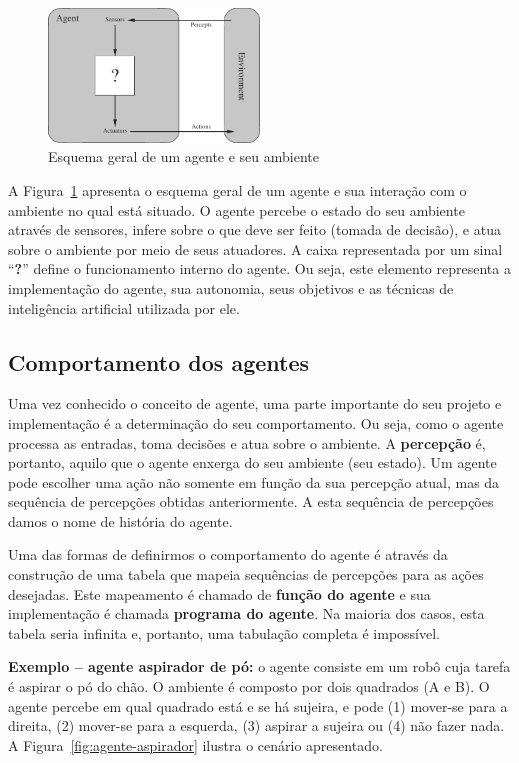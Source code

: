 \insertspace

\begin{figure}[h]
	\centering
	\includegraphics[width=0.5\textwidth]{img/agente-ambiente}
	\caption{Esquema geral de um agente e seu ambiente}
	\label{fig:agente-ambiente}
\end{figure}

A Figura~\ref{fig:agente-ambiente} apresenta o esquema geral de um agente e sua interação com o ambiente no qual está situado. O agente percebe o estado do seu ambiente através de sensores, infere sobre o que deve ser feito (tomada de decisão), e atua sobre o ambiente por meio de seus atuadores. A caixa representada por um sinal ``\textbf{?}'' define o funcionamento interno do agente. Ou seja, este elemento representa a implementação do agente, sua autonomia, seus objetivos e as técnicas de inteligência artificial utilizada por ele.

\subsection{Comportamento dos agentes}

Uma vez conhecido o conceito de agente, uma parte importante do seu projeto e implementação é a determinação do seu comportamento. Ou seja, como o agente processa as entradas, toma decisões e atua sobre o ambiente. A \textbf{percepção} é, portanto, aquilo que o agente enxerga do seu ambiente (seu estado). Um agente pode escolher uma ação não somente em função da sua percepção atual, mas da sequência de percepções obtidas anteriormente. A esta sequência de percepções damos o nome de história do agente.

Uma das formas de definirmos o comportamento do agente é através da construção de uma tabela que mapeia sequências de percepções para as ações desejadas. Este mapeamento é chamado de \textbf{função do agente} e sua implementação é chamada \textbf{programa do agente}. Na maioria dos casos, esta tabela seria infinita e, portanto, uma tabulação completa é impossível.

\textbf{Exemplo -- agente aspirador de pó:} o agente consiste em um robô cuja tarefa é aspirar o pó do chão. O ambiente é composto por dois quadrados (A e B). O agente percebe em qual quadrado está e se há sujeira, e pode (1) mover-se para a direita, (2) mover-se para a esquerda, (3) aspirar a sujeira ou (4) não fazer nada. A Figura~\ref{fig:agente-aspirador} ilustra o cenário apresentado.

